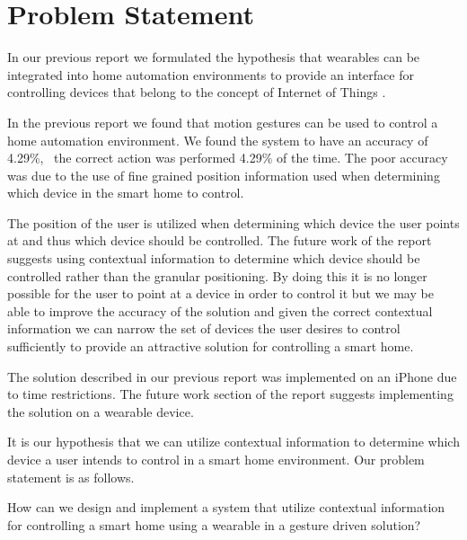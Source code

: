 \section{Problem Statement}
\label{sec:problem-statement}

In our previous report we formulated the hypothesis that wearables can be integrated into home automation environments to provide an interface for controlling devices that belong to the concept of Internet of Things \cite[pp. 14]{prespecialisation}.

In the previous report \cite[pp. 69-73]{prespecialisation} we found that motion gestures can be used to control a home automation environment. We found the system to have an accuracy of 4.29\%, \ie~the correct action was performed 4.29\% of the time. The poor accuracy was due to the use of fine grained position information used when determining which device in the smart home to control.

The position of the user is utilized when determining which device the user points at and thus which device should be controlled. The future work of the report \cite[pp. 71-73]{prespecialisation} suggests using contextual information to determine which device should be controlled rather than the granular positioning. By doing this it is no longer possible for the user to point at a device in order to control it but we may be able to improve the accuracy of the solution and given the correct contextual information we can narrow the set of devices the user desires to control sufficiently to provide an attractive solution for controlling a smart home.

The solution described in our previous report was implemented on an iPhone due to time restrictions. The future work section of the report suggests implementing the solution on a wearable device.

It is our hypothesis that we can utilize contextual information to determine which device a user intends to control in a smart home environment. Our problem statement is as follows.

\begin{framed}
How can we design and implement a system that utilize contextual information for controlling a smart home using a wearable in a gesture driven solution?
\end{framed}

